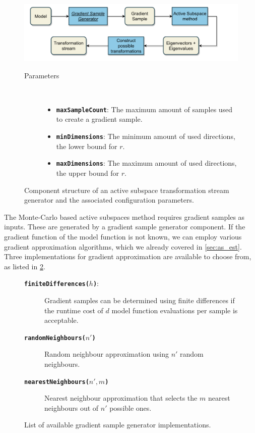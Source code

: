 \documentclass[
  a4paper,  %
  twoside,  %
  bibliography=totoc,
  headsepline,
  cleardoublepage=empty,
  parskip=half,
  draft=false
]{scrbook}
\begin{document}
\begin{mdframed}[style=style,frametitle={Transformation stream generator (active subspaces)}]
\begin{figure}[H]
\includegraphics[width=\textwidth]{graphics/TransformationStreamGen_AS.pdf}

\delimit

\begin{description}
\item[Parameters] {~ \begin{itemize}[\indent{}]
\item \texttt{\textbf{maxSampleCount}}: The maximum amount of samples used to create a gradient sample.
\item \texttt{\textbf{minDimensions}}: The minimum amount of used directions, \ie the lower bound for $r$.
\item \texttt{\textbf{maxDimensions}}: The maximum amount of used directions, \ie the upper bound for $r$.
\end{itemize}}
\end{description}
\delimit
\caption{Component structure of an active subspace transformation stream generator and the associated configuration parameters.}
\label{fig:astsg}
\end{figure}
\end{mdframed}
%
The Monte-Carlo based active subspaces method requires gradient samples as inputs.
These are generated by a gradient sample generator component.
If the gradient function of the model function is not known, we can employ various gradient approximation algorithms, which we already covered in \cref{sec:as_est}.
Three implementations for gradient approximation are available to choose from, as listed in \cref{fig:gg}.

\begin{mdframed}[style=style,frametitle={Gradient sample generators}]
\begin{figure}[H]
\begin{description}
\item[\texttt{\textbf{finiteDifferences($h$)}}:] Gradient samples can be determined using finite differences if the runtime cost of $d$ model function evaluations per sample is acceptable.
\item[\texttt{\textbf{randomNeighbours($n'$)}}] Random neighbour approximation using $n'$ random neighbours.
\item[\texttt{\textbf{nearestNeighbours($n', m$)}}] Nearest neighbour approximation that selects the $m$ nearest neighbours out of $n'$ possible ones.
\end{description}
\delimit
\caption{List of available gradient sample generator implementations.}
\label{fig:gg}
\end{figure}
\end{mdframed}
\end{document}
